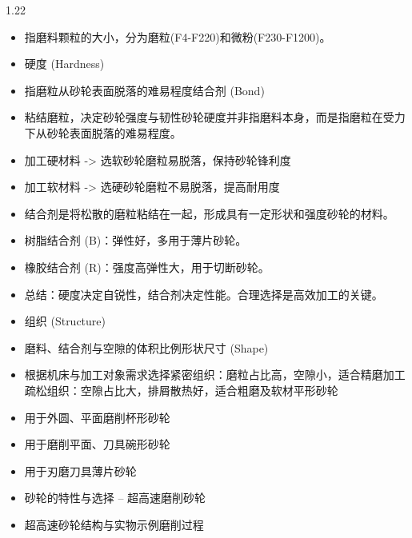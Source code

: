\documentclass[12pt,a4paper]{article}
\begin{document}
\begin{spacing}{1.22}
\begin{itemize}[leftmargin=2.2em,label=--]
  \item 指磨料颗粒的大小，分为磨粒(F4-F220)和微粉(F230-F1200)。
  \item 硬度 (Hardness)
  \item 指磨粒从砂轮表面脱落的难易程度结合剂 (Bond)
  \item 粘结磨粒，决定砂轮强度与韧性砂轮硬度并非指磨料本身，而是指磨粒在受力下从砂轮表面脱落的难易程度。
  \item 加工硬材料 -> 选软砂轮磨粒易脱落，保持砂轮锋利度
  \item 加工软材料 -> 选硬砂轮磨粒不易脱落，提高耐用度
  \item 结合剂是将松散的磨粒粘结在一起，形成具有一定形状和强度砂轮的材料。
  \item 树脂结合剂 (B)：弹性好，多用于薄片砂轮。
  \item 橡胶结合剂 (R)：强度高弹性大，用于切断砂轮。
  \item 总结：硬度决定自锐性，结合剂决定性能。合理选择是高效加工的关键。
  \item 组织 (Structure)
  \item 磨料、结合剂与空隙的体积比例形状尺寸 (Shape)
  \item 根据机床与加工对象需求选择紧密组织：磨粒占比高，空隙小，适合精磨加工疏松组织：空隙占比大，排屑散热好，适合粗磨及软材平形砂轮
  \item 用于外圆、平面磨削杯形砂轮
  \item 用于磨削平面、刀具碗形砂轮
  \item 用于刃磨刀具薄片砂轮
  \item 砂轮的特性与选择 – 超高速磨削砂轮
  \item 超高速砂轮结构与实物示例磨削过程
\end{itemize}


\end{spacing}
\end{document}
